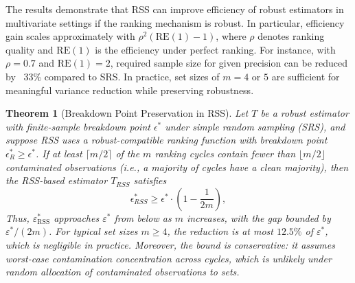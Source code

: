 \documentclass[12pt]{article}
\newtheorem{theorem}{Theorem}[section]
\begin{document}
The results demonstrate that RSS can improve efficiency of robust estimators in multivariate settings if the ranking mechanism is robust. In particular, efficiency gain scales approximately with $\rho^2(\mathrm{RE}(1) - 1)$, where $\rho$ denotes ranking quality and $\mathrm{RE}(1)$ is the efficiency under perfect ranking. For instance, with $\rho = 0.7$ and $\mathrm{RE}(1) = 2$, required sample size for given precision can be reduced by ~33\% compared to SRS. In practice, set sizes of $m=4$ or $5$ are sufficient for meaningful variance reduction while preserving robustness.

\begin{theorem}[Breakdown Point Preservation in RSS]\label{thm:bdp_preservation}
Let $T$ be a robust estimator with finite-sample breakdown point $\epsilon^*$ under simple random sampling (SRS), and suppose RSS uses a robust-compatible ranking function with breakdown point $\epsilon^*_R \geq \epsilon^*$. If at least $\lceil m/2 \rceil$ of the $m$ ranking cycles contain fewer than $\lfloor m/2 \rfloor$ contaminated observations (i.e., a majority of cycles have a clean majority), then the RSS-based estimator $T_{RSS}$ satisfies
\[
\epsilon^*_{RSS} \geq \epsilon^* \cdot \left(1 - \frac{1}{2m} \right),
\]
Thus, $\varepsilon^*_{\mathrm{RSS}}$ approaches $\varepsilon^*$ from below as $m$ increases, with the gap bounded by $\varepsilon^*/(2m)$. For typical set sizes $m \geq 4$, the reduction is at most $12.5\%$ of $\varepsilon^*$, which is negligible in practice. Moreover, the bound is conservative: it assumes worst-case contamination concentration across cycles, which is unlikely under random allocation of contaminated observations to sets.
\end{theorem}
\end{document}
